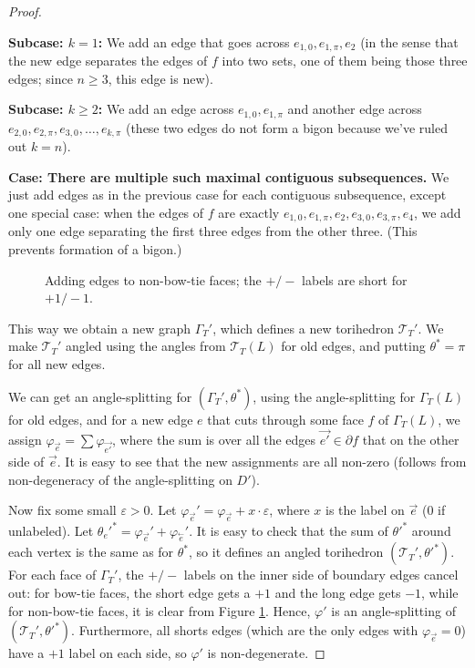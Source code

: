 \documentclass[11pt]{amsart}
\newcommand{\figref}[1]{Figure \ref{#1}}
\newcommand{\sT}{{\mathcal{T}}}
\newcommand{\cev}[1]{\overset{\leftarrow}{#1}}
\newcommand{\del}{\partial}
\newcommand{\vphi}{\varphi}
\newcommand{\veps}{\varepsilon}
\theoremstyle{plain}
\theoremstyle{definition}
\begin{document}
\begin{proof}
\begin{itemize}
\textbf{Subcase: $k=1$:}
We add an edge that goes across $e_{1,0},e_{1,\pi},e_2$
(in the sense that the new edge separates the edges of $f$ into two sets,
one of them being those three edges;
since $n\geq 3$, this edge is new).

\textbf{Subcase: $k \geq 2$:}
We add an edge across $e_{1,0},e_{1,\pi}$
and another edge across $e_{2,0},e_{2,\pi},e_{3,0},\ldots,e_{k,\pi}$
(these two edges do not form a bigon because we've ruled out $k=n$).

\textbf{Case: There are multiple such maximal contiguous subsequences.}
We just add edges as in the previous case for each contiguous subsequence,
except one special case: when the edges of $f$ are exactly
$e_{1,0},e_{1,\pi},e_2,e_{3,0},e_{3,\pi},e_4$,
we add only one edge separating the first three edges from the other three.
(This prevents formation of a bigon.)
\end{itemize}


\begin{figure}

\caption{Adding edges to non-bow-tie faces;
the $+/-$ labels are short for $+1/-1$.}
\label{f:adding_edges}
\end{figure}


This way we obtain a new graph $\Gamma_T'$, which defines a
new torihedron $\sT_T'$.
We make $\sT_T'$ angled using the angles from $\sT_T(L)$ for old edges,
and putting $\theta^* = \pi$ for all new edges.


We can get an angle-splitting for $(\Gamma_T',\theta^*)$,
using the angle-splitting for $\Gamma_T(L)$ for old edges,
and for a new edge $e$ that cuts through some face $f$ of $\Gamma_T(L)$,
we assign $\vphi_{\vec{e}} = \sum \vphi_{\vec{e'}}$,
where the sum is over all the edges $\vec{e'} \in \del f$
that on the other side of $\vec{e}$.
It is easy to see that the new assignments are all non-zero
(follows from non-degeneracy of the angle-splitting on $D'$).


Now fix some small $\veps > 0$.
Let $\vphi_{\vec{e}}' = \vphi_{\vec{e}} + x \cdot \veps$,
where $x$ is the label on $\vec{e}$ (0 if unlabeled).
Let $\theta_e'^* = \vphi_{\vec{e}}' + \vphi_{\cev{e}}'$.
It is easy to check that the sum of $\theta'^*$
around each vertex is the same as for $\theta^*$,
so it defines an angled torihedron $(\sT_T',\theta'^*)$.
For each face of $\Gamma_T'$, the $+/-$ labels
on the inner side of boundary edges cancel out:
for bow-tie faces, the short edge gets a $+1$ and the long edge
gets $-1$, while for non-bow-tie faces,
it is clear from \figref{f:adding_edges}.
Hence, $\vphi'$ is an angle-splitting of $(\sT_T',\theta'^*)$.
Furthermore, all shorts edges
(which are the only edges with $\vphi_{\vec{e}} = 0$)
have a $+1$ label on each side,
so $\vphi'$ is non-degenerate.



\end{proof}
\end{document}
